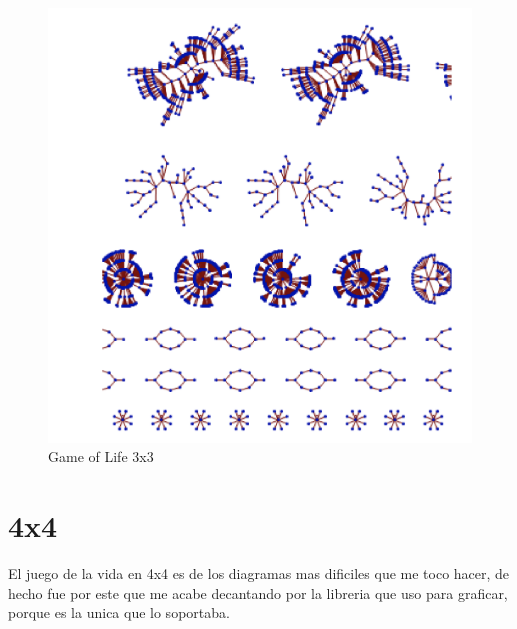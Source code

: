 \documentclass[12pt, fleqn]{report}                             %
\theoremstyle{break}                                            %
\begin{document}
        \begin{figure}[ht!]
          \centering
          \includegraphics[height=0.8\textwidth]{life3x32.png}
          \caption{Game of Life 3x3}
        \end{figure}

      \clearpage
      \section{4x4}

        El juego de la vida en 4x4 es de los diagramas mas dificiles que me toco hacer, de hecho fue por 
        este que me acabe decantando por la libreria que uso para graficar, porque es la unica que lo
        soportaba.
\end{document}
